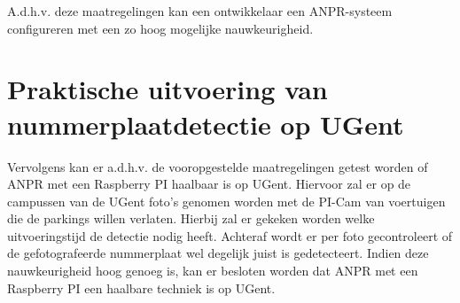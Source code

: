 A.d.h.v. deze maatregelingen kan een ontwikkelaar een ANPR-systeem configureren met een zo hoog mogelijke nauwkeurigheid. 

\section{Praktische uitvoering van nummerplaatdetectie op UGent}
Vervolgens kan er a.d.h.v. de vooropgestelde maatregelingen getest worden of ANPR met een Raspberry PI haalbaar is op UGent. Hiervoor zal er op de campussen van de UGent foto's genomen worden met de PI-Cam van voertuigen die de parkings willen verlaten. Hierbij zal er gekeken worden welke uitvoeringstijd de detectie nodig heeft. Achteraf wordt er per foto gecontroleert of de gefotografeerde nummerplaat wel degelijk juist is gedetecteert. Indien deze nauwkeurigheid hoog genoeg is, kan er besloten worden dat ANPR met een Raspberry PI een haalbare techniek is op UGent.